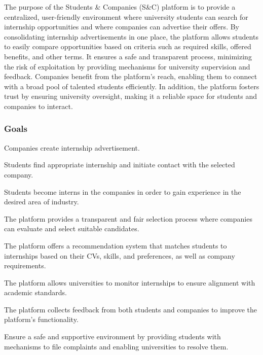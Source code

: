 \quad The purpose of the Students \& Companies (S\&C) platform is to provide a centralized, user-friendly environment where university students can search for internship opportunities and where companies can advertise their offers. By consolidating internship advertisements in one place, the platform allows students to easily compare opportunities based on criteria such as required skills, offered benefits, and other terms. It ensures a safe and transparent process, minimizing the risk of exploitation by providing mechanisms for university supervision and feedback. Companies benefit from the platform’s reach, enabling them to connect with a broad pool of talented students efficiently. In addition, the platform fosters trust by ensuring university oversight, making it a reliable space for students and companies to interact.

\subsubsection{Goals}

\begin{enumerate}[label={\textbf{[G\arabic*]}}]
    \item Companies create internship advertisement. 
    \item Students find appropriate internship and initiate contact with the selected company.
    \item Students become interns in the companies in order to gain experience in the desired area of industry.
    \item The platform provides a transparent and fair selection process where companies can evaluate and select suitable candidates.
    \item The platform offers a recommendation system that matches students to internships based on their CVs, skills, and preferences, as well as company requirements.
    \item The platform allows universities to monitor internships to ensure alignment with academic standards.
    \item The platform collects feedback from both students and companies to improve the platform’s functionality.
    \item Ensure a safe and supportive environment by providing students with mechanisms to file complaints and enabling universities to resolve them.
\end{enumerate}